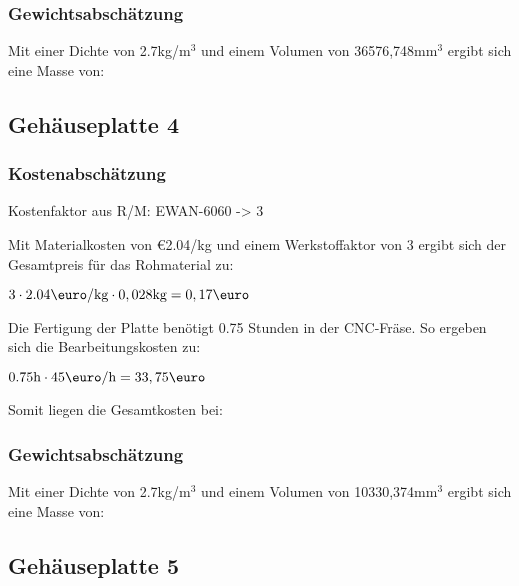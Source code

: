 \documentclass[10pt, a4paper]{article}
\begin{document}
\subsubsection{Gewichtsabschätzung}
Mit einer Dichte von 2.7kg/m$^3$ und einem Volumen von 36576,748mm$^3$ ergibt sich eine Masse von:
\begin{flushright}
\end{flushright}

\newpage
\subsection{Gehäuseplatte 4}
\begin{figure}[h]
  \centering
  \vspace{-10pt}
\end{figure}
\subsubsection{Kostenabschätzung}
\begin{center}
  Kostenfaktor aus R/M: EWAN-6060 -> 3
\end{center}
Mit Materialkosten von \euro2.04/kg und einem Werkstoffaktor von 3 ergibt sich der Gesamtpreis für das Rohmaterial zu: 
\begin{center}
    $3 \cdot 2.04\text{\euro/kg} \cdot 0,028\text{kg} = 0,17\text{\euro}$
\end{center}
Die Fertigung der Platte benötigt 0.75 Stunden in der CNC-Fräse. So ergeben sich die Bearbeitungskosten zu:
\begin{center}
  $0.75\text{h} \cdot 45\text{\euro/h}= 33,75\text{\euro}$
\end{center}
Somit liegen die Gesamtkosten bei:
\begin{flushright}
\end{flushright}
\subsubsection{Gewichtsabschätzung}
Mit einer Dichte von 2.7kg/m$^3$ und einem Volumen von 10330,374mm$^3$ ergibt sich eine Masse von:
\begin{flushright}
\end{flushright}

\newpage
\subsection{Gehäuseplatte 5}
\begin{figure}[h]
  \centering
  \vspace{-10pt}
\end{figure}
\end{document}
